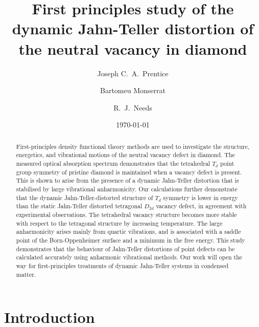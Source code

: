\documentclass[aps,showpacs,prb,reprint,superscriptaddress,longbibliography]{revtex4-1}
\begin{document}
\title{First principles study of the dynamic Jahn-Teller distortion of
  the neutral vacancy in diamond}

\author{Joseph C.\ A.\ Prentice} 
\author{Bartomeu Monserrat}
\author{R.\ J.\ Needs} 

\date{\today}


\begin{abstract}

  First-principles density functional theory methods are used to
  investigate the structure, energetics, and vibrational motions of
  the neutral vacancy defect in diamond.  The measured optical
  absorption spectrum demonstrates that the tetrahedral $T_d$ point
  group symmetry of pristine diamond is maintained when a vacancy
  defect is present. This is shown to arise from the presence of a
  dynamic Jahn-Teller distortion that is stabilised by large
  vibrational anharmonicity.  Our calculations further demonstrate
  that the dynamic Jahn-Teller-distorted structure of $T_d$ symmetry
  is lower in energy than the static Jahn-Teller distorted tetragonal
  $D_{2d}$ vacancy defect, in agreement with experimental
  observations.  The tetrahedral vacancy structure becomes more stable
  with respect to the tetragonal structure by increasing temperature.
  The large anharmonicity arises mainly from quartic vibrations, and
  is associated with a saddle point of the Born-Oppenheimer surface
  and a minimum in the free energy.  This study demonstrates that the
  behaviour of Jahn-Teller distortions of point defects can be
  calculated accurately using anharmonic vibrational methods.  Our
  work will open the way for first-principles treatments of dynamic
  Jahn-Teller systems in condensed matter.
\end{abstract}

\maketitle

\section{Introduction}
\end{document}

